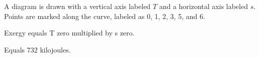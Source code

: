 A diagram is drawn with a vertical axis labeled \( T \) and a horizontal axis labeled \( s \). Points are marked along the curve, labeled as 0, 1, 2, 3, 5, and 6.

Exergy equals T zero multiplied by s zero.  

Equals 732 kilojoules.